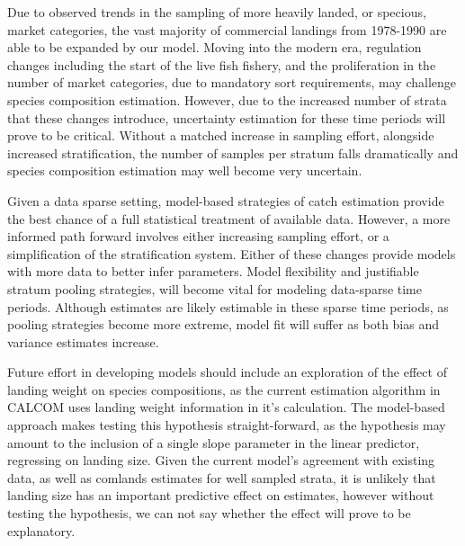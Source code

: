 \documentclass[12pt]{article}
\begin{document}

Due to observed trends in the sampling of more heavily landed, or
specious, market categories, the vast majority of commercial landings
from 1978-1990 are able to be expanded by our model. Moving into the
modern era, regulation changes including the start of the live fish
fishery, and the proliferation in the number of market categories, due
to mandatory sort requirements, may challenge species composition
estimation. However, due to the increased number of strata that these
changes introduce, uncertainty estimation for these time periods will
prove to be critical. Without a matched increase in sampling effort,
alongside increased stratification, the number of samples per stratum
falls dramatically and species composition estimation may well become
very uncertain.

Given a data sparse setting, model-based strategies of catch estimation
provide the best chance of a full statistical treatment of available
data. However, a more informed path forward involves either increasing
sampling effort, or a simplification of the stratification system.
Either of these changes provide models with more data to better infer
parameters. Model flexibility and justifiable stratum pooling
strategies, will become vital for modeling data-sparse time periods.
Although estimates are likely estimable in these sparse time periods, as
pooling strategies become more extreme, model fit will suffer as both
bias and variance estimates increase.


Future effort in developing models should include an exploration of the
effect of landing weight on species compositions, as the current estimation
algorithm in CALCOM uses landing weight information in it's calculation. The 
model-based approach makes testing this hypothesis straight-forward, as the 
hypothesis may amount to the inclusion of a single slope parameter in the 
linear predictor, regressing on landing size. Given the current model's 
agreement with existing data, as well as comlands estimates for well sampled 
strata, it is unlikely that landing size has an important predictive effect on 
estimates, however without testing the hypothesis, we can not say whether the 
effect will prove to be explanatory.
\end{document}
